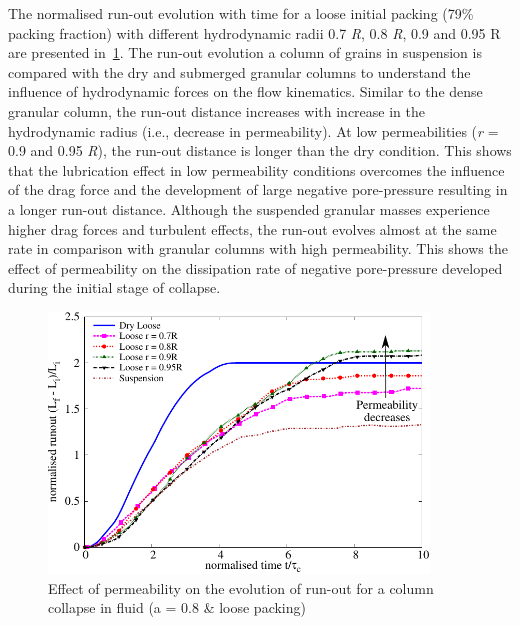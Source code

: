 The normalised run-out evolution with time for a loose initial packing (79\% 
packing fraction) with different hydrodynamic radii 0.7 \textit{R}, 0.8 
\textit{R}, 0.9 and 0.95 R are presented in~\cref{fig:Runout_a08_loose}. The 
run-out evolution a column of grains in suspension is compared with the dry and 
submerged granular columns to understand the influence of hydrodynamic forces 
on the flow kinematics. Similar to the dense granular column, the run-out 
distance increases with increase in the hydrodynamic radius (i.e., decrease in 
permeability). At low permeabilities (\textit{r} = 0.9 and 0.95 \textit{R}), 
the run-out distance is longer than the dry condition. This shows that the 
lubrication effect in low permeability conditions overcomes the influence of 
the drag force and the development of large negative pore-pressure resulting in 
a longer run-out distance. Although the suspended granular masses experience 
higher drag forces and turbulent effects, the run-out evolves almost at the 
same rate in comparison with granular columns with high permeability. This 
shows the effect of permeability on the dissipation rate of negative 
pore-pressure developed during the initial stage of collapse.

\begin{figure}
\centering
\includegraphics[width=0.9\textwidth]{Runout_a08_loose}
\caption{Effect of permeability on the evolution of run-out for a column 
collapse in fluid (a = 0.8 \& loose packing)}
\label{fig:Runout_a08_loose}
\end{figure}

